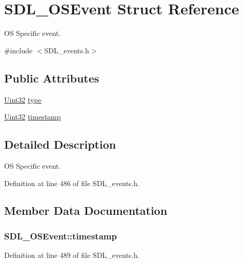 \hypertarget{struct_s_d_l___o_s_event}{\section{S\-D\-L\-\_\-\-O\-S\-Event Struct Reference}
\label{struct_s_d_l___o_s_event}
}


O\-S Specific event.  




{\ttfamily \#include $<$S\-D\-L\-\_\-events.\-h$>$}

\subsection*{Public Attributes}
\begin{DoxyCompactItemize}
\item 
\hyperlink{_s_d_l__stdinc_8h_add440eff171ea5f55cb00c4a9ab8672d}{Uint32} \hyperlink{struct_s_d_l___o_s_event_a85a600619ebebc8db007fc757b3895a5}{type}
\item 
\hyperlink{_s_d_l__stdinc_8h_add440eff171ea5f55cb00c4a9ab8672d}{Uint32} \hyperlink{struct_s_d_l___o_s_event_a8b2480eefadad9f3f8c94f8e550b7fb0}{timestamp}
\end{DoxyCompactItemize}


\subsection{Detailed Description}
O\-S Specific event. 

Definition at line 486 of file S\-D\-L\-\_\-events.\-h.



\subsection{Member Data Documentation}
\hypertarget{struct_s_d_l___o_s_event_a8b2480eefadad9f3f8c94f8e550b7fb0}{
\subsubsection[{timestamp}]{ S\-D\-L\-\_\-\-O\-S\-Event\-::timestamp}}\label{struct_s_d_l___o_s_event_a8b2480eefadad9f3f8c94f8e550b7fb0}


Definition at line 489 of file S\-D\-L\-\_\-events.\-h.

